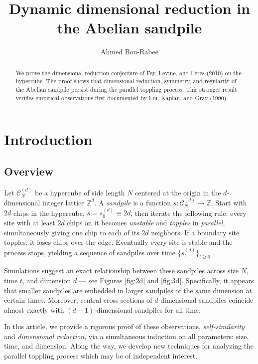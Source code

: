 \documentclass[12pt]{amsart}
\title{Dynamic dimensional reduction in the Abelian sandpile}
\author{Ahmed Bou-Rabee}
\newcommand{\Z}{\mathbb{Z}}
\begin{document}
	
	\begin{abstract}
		We prove the dimensional reduction conjecture of Fey, Levine, and Peres (2010) on the hypercube. 
		The proof shows that dimensional reduction, symmetry, and regularity of the Abelian sandpile persist during the parallel toppling process. This stronger result verifies empirical observations first documented by Liu, Kaplan, and Gray (1990).  %
	\end{abstract}
	\maketitle
	
	\section{Introduction}
	
	\subsection{Overview} \label{subsec:overview} 
	Let $\mathcal{C}_N^{(d)}$ be a hypercube of side length $N$ centered at the origin in the $d$-dimensional integer lattice $\Z^d$.  A {\it sandpile} is a function $s: \mathcal{C}_N^{(d)} \to \Z$. Start with $2d$ chips in the hypercube,  $s = s_0^{(d)} \equiv 2d$, then iterate the following rule: every site with at least $2d$ chips on it becomes {\it unstable} 
	and {\it topples} in {\it parallel}, simultaneously giving one chip to each of its $2d$ neighbors. If a boundary site topples, it loses chips over the edge. Eventually every site is stable and the process stops, yielding a sequence of sandpiles over time $\{s_t^{(d)}\}_{t \geq 0}$ \cite{bak1987self, dhar1990self, holroyd2008chip,levine2010sandpile,levine2017laplacian,jarai2018sandpile, klivans2018mathematics}.
	
	Simulations suggest an exact relationship between these sandpiles across size $N$, time $t$, and dimension $d$ --- see Figures \ref{fig:2d} and \ref{fig:3d}. 
	Specifically, it appears that smaller sandpiles are embedded in larger sandpiles of the same dimension at certain times. Moreover, 
	central cross sections of $d$-dimensional sandpiles coincide almost exactly with $(d-1)$-dimensional sandpiles for all time.  
	
	In this article, we provide a rigorous proof of these observations, {\it self-similarity} and {\it dimensional reduction}, 
	via a simultaneous induction on all parameters: size, time, and dimension. Along the way, we develop new techniques for analyzing the parallel toppling process which may be of independent interest.  %
\end{document}
